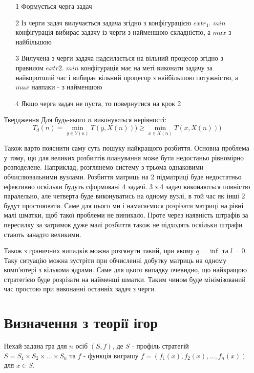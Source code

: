 \begin{itemize}
	\item[1] Формується черга задач
	\item[2] Із черги задач вилучається задача згідно з конфігурацією $extr_1$. $min$ конфігурація вибирає задачу із черги з найменшою складністю, а $max$ з найбільшою
	\item[3] Вилучена з черги задача надсилається на вільний процесор згідно з правилом $extr2$. $min$ конфігурація має на меті виконати задачу за найкоротший час і вибирає вільний процесор з найбільшою потужністю, а $max$ навпаки - з найменшою
	\item[4] Якщо черга задач не пуста, то повернутися на крок 2
\end{itemize}

Твердження
Для будь-якого $n$ виконуються нерівності:
\begin{equation}
	T_d(n) = \min\limits_{y \in Y(n)} T(y, X(n))) \ge \min\limits_{x \in X(n)} T(x, X(n)))
\end{equation}

Також варто пояснити саму суть пошуку найкращого розбиття. Основна проблема у тому, що для великих розбиттів планування може бути недостаньо рівномірно розподелене. Наприклад, розглянемо систему з трьома однаковими обчислювальними вузлами. Розбиття матриць на 2 підматриці буде недостатньо ефективно оскільки будуть сформовані 4 задачі. 3 з 4 задач виконаються повністю паралельно, але четверта буде виконуватись на одному вузлі, в той час як інші 2 будут простоювати. Саме для цього ми і намагаємося розрізати матриці на рівні малі шматки, щоб такої проблеми не виникало. Проте через наявність штрафів за пересилку за затримок дуже малі розбиття також не підходять оскільки штрафи стають занадто великими.

Також з граничних випадків можна розгянути такий, при якому $q=\inf$ та $l=0$. Таку ситуацію можна зустріти при обчисленні добутку матриць на одному комп'ютері з кількома ядрами. Саме для цього випадку очевидно, що найкращою стратегією буде розрізати на найменші шматки. Таким чином буде мінімізований час простою при виконанні останніх задач з черги.

\section{Визначення з теорії ігор}

Нехай задана гра для $n$ осіб $(S,f)$, де $S$ - профіль стратегій $S=S_1 \times S_2 \times \ldots \times S_n$ та $f$ - функція виграшу $f=(f_1(x),f_2(x), \ldots, f_n(x))$ для $x \in S$.

